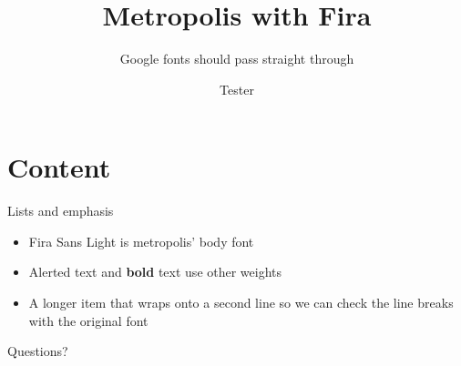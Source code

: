 \documentclass[aspectratio=169]{beamer}
\title{Metropolis with Fira}
\subtitle{Google fonts should pass straight through}
\author{Tester}
\date{}
\begin{document}
\maketitle

\section{Content}

\begin{frame}{Lists and emphasis}
  \begin{itemize}
    \item Fira Sans Light is metropolis' body font
    \item \alert{Alerted} text and \textbf{bold} text use other weights
    \item A longer item that wraps onto a second line so we can check the line breaks with the original font
  \end{itemize}
\end{frame}

\begin{frame}[standout]
  Questions?
\end{frame}
\end{document}
